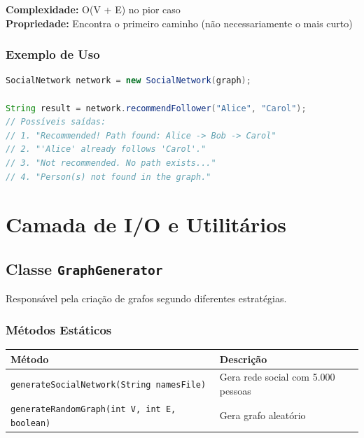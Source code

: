 \documentclass[12pt,a4paper]{article}
\begin{document}
\textbf{Complexidade:} O(V + E) no pior caso \\
\textbf{Propriedade:} Encontra o primeiro caminho (não necessariamente o mais curto)

\subsubsection{Exemplo de Uso}

\begin{lstlisting}[language=Java, caption=Sistema de Recomendação de Seguidores]
SocialNetwork network = new SocialNetwork(graph);

String result = network.recommendFollower("Alice", "Carol");
// Possíveis saídas:
// 1. "Recommended! Path found: Alice -> Bob -> Carol"
// 2. "'Alice' already follows 'Carol'."
// 3. "Not recommended. No path exists..."
// 4. "Person(s) not found in the graph."
\end{lstlisting}

\newpage

\section{Camada de I/O e Utilitários}

\subsection{Classe \texttt{GraphGenerator}}

Responsável pela criação de grafos segundo diferentes estratégias.

\subsubsection{Métodos Estáticos}

\begin{table}[h]
\centering
\begin{tabular}{|l|l|}
\hline
\textbf{Método} & \textbf{Descrição} \\
\hline
\texttt{generateSocialNetwork(String namesFile)} & Gera rede social com 5.000 pessoas \\
\hline
\texttt{generateRandomGraph(int V, int E, boolean)} & Gera grafo aleatório \\
\hline
\end{tabular}
\end{table}
\end{document}
